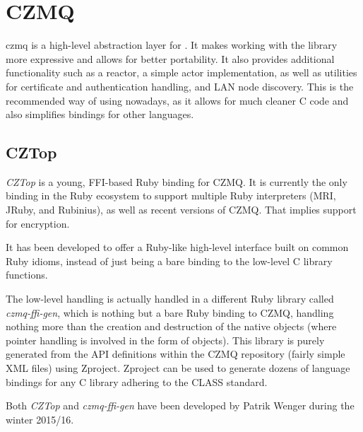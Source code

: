 \section{CZMQ}
\gls{czmq} is a high-level abstraction layer for \zmq. It makes working with the \zmq
library more expressive and allows for better portability. It also provides
additional functionality such as a reactor, a simple actor implementation, as
well as utilities for certificate and authentication handling, and LAN node
discovery. This is the recommended way of using \zmq nowadays, as it allows for
much cleaner C code and also simplifies bindings for other languages.

\subsection{CZTop}
\emph{CZTop} is a young, \gls{FFI}-based Ruby binding for CZMQ. It is currently
the only binding in the Ruby ecosystem to support multiple Ruby interpreters
(\gls{MRI}, \gls{JRuby}, and \gls{Rubinius}), as well as recent versions of
CZMQ. That implies support for encryption.

It has been developed to offer a Ruby-like high-level interface built on common
Ruby idioms, instead of just being a bare binding to the low-level C library
functions.

The low-level handling is actually handled in a different Ruby library called
\emph{czmq-ffi-gen}, which is nothing but a bare Ruby binding to CZMQ, handling
nothing more than the creation and destruction of the native objects (where
pointer handling is involved in the form of  objects). This
library is purely generated from the API definitions within the CZMQ repository
(fairly simple XML files) using Zproject. Zproject can be used to generate
dozens of language bindings for any C library adhering to the \gls{CLASS}
standard.

Both \emph{CZTop} and \emph{czmq-ffi-gen} have been developed by Patrik Wenger
during the winter 2015/16.

